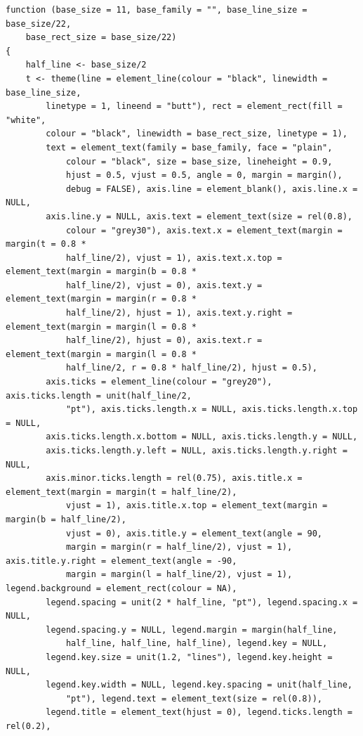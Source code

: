 \documentclass[
  letterpaper,
  DIV=11,
  numbers=noendperiod]{scrreprt}
\begin{document}
\begin{verbatim}
function (base_size = 11, base_family = "", base_line_size = base_size/22, 
    base_rect_size = base_size/22) 
{
    half_line <- base_size/2
    t <- theme(line = element_line(colour = "black", linewidth = base_line_size, 
        linetype = 1, lineend = "butt"), rect = element_rect(fill = "white", 
        colour = "black", linewidth = base_rect_size, linetype = 1), 
        text = element_text(family = base_family, face = "plain", 
            colour = "black", size = base_size, lineheight = 0.9, 
            hjust = 0.5, vjust = 0.5, angle = 0, margin = margin(), 
            debug = FALSE), axis.line = element_blank(), axis.line.x = NULL, 
        axis.line.y = NULL, axis.text = element_text(size = rel(0.8), 
            colour = "grey30"), axis.text.x = element_text(margin = margin(t = 0.8 * 
            half_line/2), vjust = 1), axis.text.x.top = element_text(margin = margin(b = 0.8 * 
            half_line/2), vjust = 0), axis.text.y = element_text(margin = margin(r = 0.8 * 
            half_line/2), hjust = 1), axis.text.y.right = element_text(margin = margin(l = 0.8 * 
            half_line/2), hjust = 0), axis.text.r = element_text(margin = margin(l = 0.8 * 
            half_line/2, r = 0.8 * half_line/2), hjust = 0.5), 
        axis.ticks = element_line(colour = "grey20"), axis.ticks.length = unit(half_line/2, 
            "pt"), axis.ticks.length.x = NULL, axis.ticks.length.x.top = NULL, 
        axis.ticks.length.x.bottom = NULL, axis.ticks.length.y = NULL, 
        axis.ticks.length.y.left = NULL, axis.ticks.length.y.right = NULL, 
        axis.minor.ticks.length = rel(0.75), axis.title.x = element_text(margin = margin(t = half_line/2), 
            vjust = 1), axis.title.x.top = element_text(margin = margin(b = half_line/2), 
            vjust = 0), axis.title.y = element_text(angle = 90, 
            margin = margin(r = half_line/2), vjust = 1), axis.title.y.right = element_text(angle = -90, 
            margin = margin(l = half_line/2), vjust = 1), legend.background = element_rect(colour = NA), 
        legend.spacing = unit(2 * half_line, "pt"), legend.spacing.x = NULL, 
        legend.spacing.y = NULL, legend.margin = margin(half_line, 
            half_line, half_line, half_line), legend.key = NULL, 
        legend.key.size = unit(1.2, "lines"), legend.key.height = NULL, 
        legend.key.width = NULL, legend.key.spacing = unit(half_line, 
            "pt"), legend.text = element_text(size = rel(0.8)), 
        legend.title = element_text(hjust = 0), legend.ticks.length = rel(0.2), 

\end{verbatim}
\end{document}

